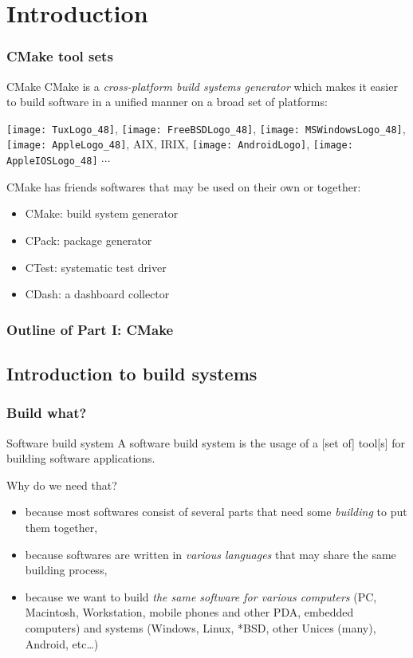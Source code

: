 \documentclass[compress,slidestop,table,usepdftitle=false
              ]
               {beamer}
\begin{document}
\section{Introduction}
\begin{frame}[fragile]
\frametitle{CMake tool sets}

\begin{block}{CMake}
CMake is a \emph{cross-platform build systems generator} which makes it easier
to build software in a unified manner on a broad set of platforms:

\texttt{[image: TuxLogo\_48]},
\texttt{[image: FreeBSDLogo\_48]},
\texttt{[image: MSWindowsLogo\_48]},
\texttt{[image: AppleLogo\_48]},
AIX, IRIX,
\texttt{[image: AndroidLogo]},
\texttt{[image: AppleIOSLogo\_48]}
$\cdots$
\end{block}
CMake has friends softwares that may be used on their own or together:
\begin{itemize}
\item CMake: build system generator
\item CPack: package generator
\item CTest: systematic test driver
\item CDash: a dashboard collector
\end{itemize}
\end{frame}

\begin{frame}
\frametitle{Outline of Part I: CMake}
\tableofcontents[part=1]
\end{frame}

\subsection*{Introduction to build systems}
\begin{frame}
\frametitle{Build what?}
\begin{block}{Software build system}
A software build system is the usage of a [set of] tool[s] for building software applications.
\end{block}
\begin{block}{Why do we need that?}
\begin{itemize}
\pause
\item because most softwares consist of several parts that need
      some \emph{building} to put them together,
\pause
\item because softwares are written in \emph{various languages}
      that may share the same building process,
\pause
\item because we want to build \emph{the same software for various computers} {\scriptsize (PC, Macintosh, Workstation, mobile phones and other PDA, embedded computers) and systems (Windows, Linux, *BSD, other Unices (many), Android, etc\ldots)}
\end{itemize}
\end{block}
\end{frame}
\end{document}
